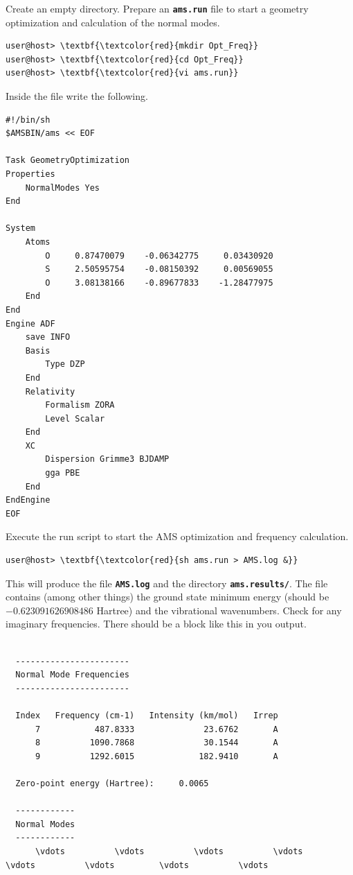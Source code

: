 \documentclass[a4paper,11pt,DIV=15,openany]{scrbook}
\newcommand{\ttt}[1]{\textbf{\texttt{#1}}}
\begin{document}
Create an empty directory. 
Prepare an \ttt{ams.run} file to start a geometry optimization and calculation of the normal modes.
\begin{Verbatim}[commandchars=\\\{\}]
user@host> \textbf{\textcolor{red}{mkdir Opt_Freq}}
user@host> \textbf{\textcolor{red}{cd Opt_Freq}}
user@host> \textbf{\textcolor{red}{vi ams.run}}
\end{Verbatim}
Inside the file write the following.
\begin{oframed}
\footnotesize\begin{Verbatim}[commandchars=\\\{\}]
#!/bin/sh 
$AMSBIN/ams << EOF 
 
Task GeometryOptimization 
Properties 
    NormalModes Yes 
End 
 
System 
    Atoms 
        O     0.87470079    -0.06342775     0.03430920 
        S     2.50595754    -0.08150392     0.00569055 
        O     3.08138166    -0.89677833    -1.28477975 
    End 
End 
Engine ADF 
    save INFO 
    Basis 
        Type DZP 
    End 
    Relativity 
        Formalism ZORA 
        Level Scalar 
    End 
    XC
        Dispersion Grimme3 BJDAMP
        gga PBE
    End 
EndEngine
EOF
\end{Verbatim}
\end{oframed}

\normalsize

Execute the run script to start the \textsc{AMS} optimization and frequency calculation.
\begin{Verbatim}[commandchars=\\\{\}]
user@host> \textbf{\textcolor{red}{sh ams.run > AMS.log &}}
\end{Verbatim}
This will produce the file \ttt{AMS.log} and the directory \ttt{ams.results/}. 
The file contains (among other things) the ground state minimum energy (should be $-0.623091626908486$ Hartree) and the vibrational wavenumbers. 
Check for any imaginary frequencies.
There should be a block like this in you output.
\begin{oframed}
\footnotesize\begin{Verbatim}[commandchars=\\\{\}]

  -----------------------
  Normal Mode Frequencies
  -----------------------
 
  Index   Frequency (cm-1)   Intensity (km/mol)   Irrep
      7           487.8333              23.6762       A
      8          1090.7868              30.1544       A
      9          1292.6015             182.9410       A
 
  Zero-point energy (Hartree):     0.0065
 
  ------------
  Normal Modes
  ------------
      \vdots          \vdots          \vdots          \vdots         \vdots          \vdots         \vdots          \vdots
\end{Verbatim}
\end{oframed}
\end{document}
